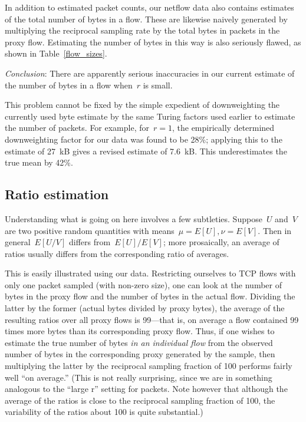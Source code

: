 \documentclass{paper}
\begin{document}
In addition to estimated packet counts, our netflow data also contains estimates
of the total number of bytes in a flow. These are likewise naively generated by
multiplying the reciprocal sampling rate by the total bytes in packets in the
proxy flow. Estimating the number of bytes in this way is also seriously flawed,
as shown in Table~\ref{flow_sizes}.

\emph{Conclusion}: There are apparently serious inaccuracies in our current
estimate of the number of bytes in a flow when~$r$ is small.

This problem cannot be fixed by the simple expedient of downweighting the
currently used byte estimate by the same Turing factors used earlier to estimate
the number of packets. For example, for~$r = 1$, the empirically determined
downweighting factor for our data was found to be 28\%; applying this to the
estimate of 27~kB gives a revised estimate of 7.6~kB. This underestimates the
true mean by 42\%.

\subsection{Ratio estimation}

Understanding what is going on here involves a few subtleties. Suppose~$U$
and~$V$ are two positive random quantities with means~$\mu = E[U], \nu = E[V]$.
Then in general~$E[U/V]$ differs from~$E[U]/E[V]$; more prosaically, an average
of ratios usually differs from the corresponding ratio of averages.

This is easily illustrated using our data. Restricting ourselves to TCP flows
with only one packet sampled (with non-zero size), one can look at the number
of bytes in the proxy flow and the number of bytes in the actual flow. Dividing
the latter by the former (actual bytes divided by proxy bytes), the average of
the resulting ratios over all proxy flows is 99---that is, on average a flow
contained 99 times more bytes than its corresponding proxy flow. Thus, if one
wishes to estimate the true number of bytes \emph{in an individual flow} from
the observed number of bytes in the corresponding proxy generated by the
sample, then multiplying the latter by the reciprocal sampling fraction of 100
performs fairly well ``on average.'' (This is not really surprising, since we
are in something analogous to the ``large r'' setting for packets. Note however
that although the average of the ratios is close to the reciprocal sampling
fraction of 100, the variability of the ratios about 100 is quite substantial.)
\end{document}

